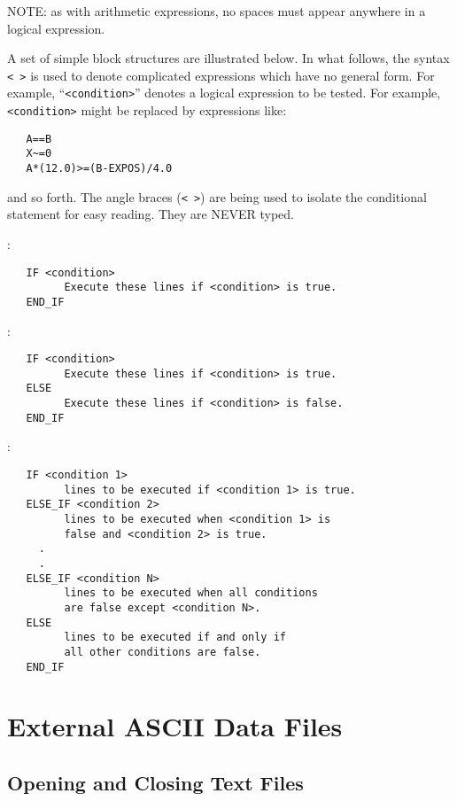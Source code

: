 \noindent NOTE: as with arithmetic expressions, no spaces must appear anywhere
in a logical expression.

A set of simple  block structures are illustrated below.  In what
follows, the syntax \verb+< >+ is used to denote complicated expressions which
have no general form.  For example, ``\verb+<condition>+'' denotes a logical
expression to be tested.  For example, \verb+<condition>+ might be replaced by
expressions like:
\begin{verbatim}
   A==B
   X~=0
   A*(12.0)>=(B-EXPOS)/4.0
\end{verbatim}
and so forth.  The angle braces (\verb+< >+) are being used to isolate the
conditional statement for easy reading.  They are NEVER typed.

\noindent {}:
\begin{verbatim}
   IF <condition>
         Execute these lines if <condition> is true.
   END_IF
\end{verbatim}

\noindent {}:
\begin{verbatim}
   IF <condition>
         Execute these lines if <condition> is true.
   ELSE
         Execute these lines if <condition> is false.
   END_IF
\end{verbatim}


\noindent {}:
\begin{verbatim}
   IF <condition 1>
         lines to be executed if <condition 1> is true.
   ELSE_IF <condition 2>
         lines to be executed when <condition 1> is
         false and <condition 2> is true.
     .
     .
   ELSE_IF <condition N>
         lines to be executed when all conditions
         are false except <condition N>.
   ELSE
         lines to be executed if and only if
         all other conditions are false.
   END_IF
\end{verbatim}


\section{External ASCII Data Files}

\subsection{Opening and Closing Text Files}

